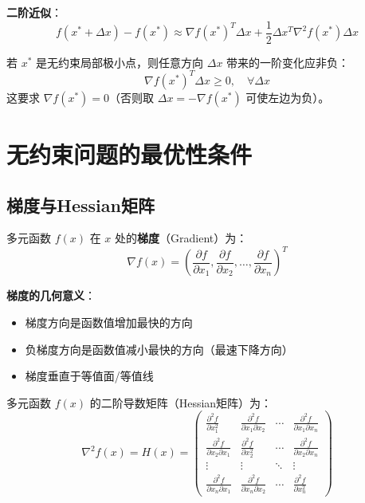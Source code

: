 \textbf{二阶近似}：
\[
f(x^* + \Delta x) - f(x^*) \approx \nabla f(x^*)^T \Delta x + \frac{1}{2} \Delta x^T \nabla^2 f(x^*) \Delta x
\]

\begin{conceptbox}[关键观察]
若 $x^*$ 是无约束局部极小点，则任意方向 $\Delta x$ 带来的一阶变化应非负：
\[
\nabla f(x^*)^T \Delta x \geq 0,\quad \forall \Delta x
\]
这要求 $\nabla f(x^*) = 0$（否则取 $\Delta x = -\nabla f(x^*)$ 可使左边为负）。
\end{conceptbox}

\section{无约束问题的最优性条件}\label{sec:optimality-unconstrained}

\subsection{梯度与Hessian矩阵}

\begin{definition}[梯度]
多元函数 $f(x)$ 在 $x$ 处的\textbf{梯度}（Gradient）为：
\[
\nabla f(x) = \left(\frac{\partial f}{\partial x_1}, \frac{\partial f}{\partial x_2}, \ldots, \frac{\partial f}{\partial x_n}\right)^T
\]
\end{definition}

\textbf{梯度的几何意义}：
\begin{itemize}
    \item 梯度方向是函数值增加最快的方向
    \item 负梯度方向是函数值减小最快的方向（最速下降方向）
    \item 梯度垂直于等值面/等值线
\end{itemize}

\begin{definition}[Hessian矩阵]
多元函数 $f(x)$ 的二阶导数矩阵（Hessian矩阵）为：
\[
\nabla^2 f(x) = H(x) = \begin{pmatrix}
\frac{\partial^2 f}{\partial x_1^2} & \frac{\partial^2 f}{\partial x_1 \partial x_2} & \cdots & \frac{\partial^2 f}{\partial x_1 \partial x_n} \\[6pt]
\frac{\partial^2 f}{\partial x_2 \partial x_1} & \frac{\partial^2 f}{\partial x_2^2} & \cdots & \frac{\partial^2 f}{\partial x_2 \partial x_n} \\[6pt]
\vdots & \vdots & \ddots & \vdots \\[6pt]
\frac{\partial^2 f}{\partial x_n \partial x_1} & \frac{\partial^2 f}{\partial x_n \partial x_2} & \cdots & \frac{\partial^2 f}{\partial x_n^2}
\end{pmatrix}
\]
\end{definition}

